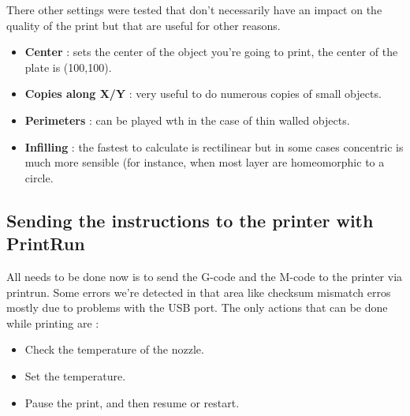 \documentclass{article}
\begin{document}
There other settings were tested that don't necessarily have an impact on the quality of the print but that are useful for other reasons.
\begin{itemize}
\item \textbf{Center} : sets the center of the object you're going to print, the center of the plate is (100,100).
\item \textbf{Copies along X/Y} : very useful to do numerous copies of small objects.
\item \textbf{Perimeters} : can be played wth in the case of thin walled objects.
\item \textbf{Infilling} : the fastest to calculate is rectilinear but in some cases concentric is much more sensible (for instance, when most layer are homeomorphic to a circle.
\end{itemize}

\subsection{Sending the instructions to the printer with PrintRun}
All needs to be done now is to send the G-code and the M-code to the printer via printrun. Some errors we're detected in that area like checksum mismatch erros mostly due to problems with the USB port. The only actions that can be done while printing are :
\begin{itemize}
\item Check the temperature of the nozzle.
\item Set the temperature.
\item Pause the print, and then resume or restart.
\end{itemize}
\end{document}
